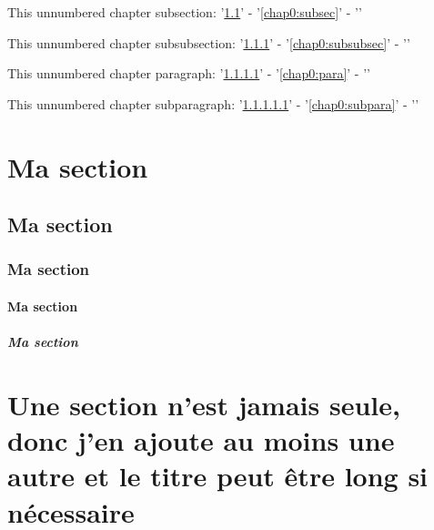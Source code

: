 \documentclass[bare]{polytech/polytech}
\begin{document}
This unnumbered chapter subsection: '\ref{chap0:subsec}' - '\autoref{chap0:subsec}' - ''

This unnumbered chapter subsubsection: '\ref{chap0:subsubsec}' - '\autoref{chap0:subsubsec}' - ''

This unnumbered chapter paragraph: '\ref{chap0:para}' - '\autoref{chap0:para}' - ''

This unnumbered chapter subparagraph: '\ref{chap0:subpara}' - '\autoref{chap0:subpara}' - ''
              

\lipsum[1-5]

\section{Ma section}

\label{chap0:sec}

\lipsum[1-3]

\subsection{Ma section}

\label{chap0:subsec}

\lipsum[1-3]

\subsubsection{Ma section}

\label{chap0:subsubsec}

\lipsum[1-3]

\paragraph{Ma section}

\label{chap0:para}

\lipsum[1-3]

\subparagraph{Ma section}

\label{chap0:subpara}

\lipsum[1-3]

\section{Une section n'est jamais seule, donc j'en ajoute au moins une autre et le titre peut être long si nécessaire}

\lipsum[1-3]
                       
\end{document}
